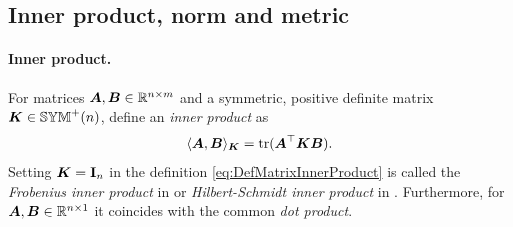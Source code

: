 \subsection{Inner product, norm and metric}
\paragraph{Inner product.}
For matrices $\mat{A}, \mat{B} \in \RealNum^{n\times m}$ and a symmetric, positive definite matrix $ \mat{K} \in \SymMatP(n)$, define an \textit{inner product} as
\begin{align}\label{eq:DefMatrixInnerProduct}
 \sProd[\mat{K}]{\mat{A}}{\mat{B}} = \tr(\mat{A}^\top \mat{K} \mat{B}).
\end{align}
Setting $\mat{K} = \idMat[n]$ in the definition \eqref{eq:DefMatrixInnerProduct} is called the \textit{Frobenius inner product} in \cite[sec.\ 5.2]{Horn:MatrixAnalysis} or \textit{Hilbert-Schmidt inner product} in \cite[sec.\ A.6]{Hall:LieGroups}.
Furthermore, for $\mat{A}, \mat{B} \in \RealNum^{n\times 1}$ it coincides with the common \textit{dot product}.

